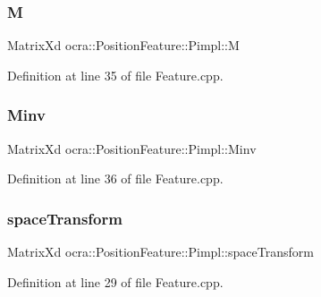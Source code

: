 \hypertarget{structocra_1_1PositionFeature_1_1Pimpl_aa061dcd02d8f11de5edd55e8f2535bfe}{}\label{structocra_1_1PositionFeature_1_1Pimpl_aa061dcd02d8f11de5edd55e8f2535bfe} 
\subsubsection{\texorpdfstring{M}{M}}
{\footnotesize\ttfamily Matrix\+Xd ocra\+::\+Position\+Feature\+::\+Pimpl\+::M}



Definition at line 35 of file Feature.\+cpp.

\hypertarget{structocra_1_1PositionFeature_1_1Pimpl_a7f6b8df16f7f9cbbe8e917e3ed4811eb}{}\label{structocra_1_1PositionFeature_1_1Pimpl_a7f6b8df16f7f9cbbe8e917e3ed4811eb} 
\subsubsection{\texorpdfstring{Minv}{Minv}}
{\footnotesize\ttfamily Matrix\+Xd ocra\+::\+Position\+Feature\+::\+Pimpl\+::\+Minv}



Definition at line 36 of file Feature.\+cpp.

\hypertarget{structocra_1_1PositionFeature_1_1Pimpl_a2e80e58cc94be8c44f8fee3dd030192e}{}\label{structocra_1_1PositionFeature_1_1Pimpl_a2e80e58cc94be8c44f8fee3dd030192e} 
\subsubsection{\texorpdfstring{space\+Transform}{spaceTransform}}
{\footnotesize\ttfamily Matrix\+Xd ocra\+::\+Position\+Feature\+::\+Pimpl\+::space\+Transform}



Definition at line 29 of file Feature.\+cpp.

\hypertarget{structocra_1_1PositionFeature_1_1Pimpl_a5299db1f5f86c7a5808fbf1738ee438a}{}\label{structocra_1_1PositionFeature_1_1Pimpl_a5299db1f5f86c7a5808fbf1738ee438a} 
